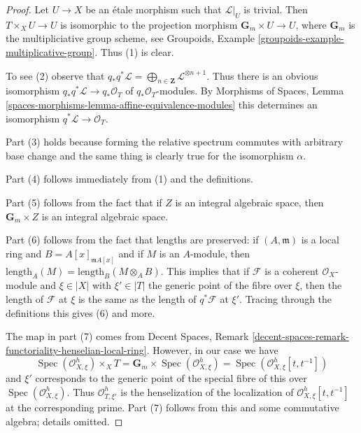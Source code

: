 \documentclass{stacks-project}
\theoremstyle{plain}
\theoremstyle{definition}
\theoremstyle{remark}
\numberwithin{equation}{subsection}
\def\Spec{\mathop{\mathrm{Spec}}}
\begin{document}
\begin{proof}
Let $U \to X$ be an \'etale morphism such that $\mathcal{L}|_U$
is trivial. Then $T \times_X U \to U$ is isomorphic to the projection
morphism $\mathbf{G}_m \times U \to U$, where
$\mathbf{G}_m$ is the multipliciative group scheme, see
Groupoids, Example \ref{groupoids-example-multiplicative-group}.
Thus (1) is clear.

\medskip\noindent
To see (2) observe that
$q_*q^*\mathcal{L} =
\bigoplus_{n \in \mathbf{Z}} \mathcal{L}^{\otimes n + 1}$.
Thus there is an obvious isomorphism
$q_*q^*\mathcal{L} \to q_*\mathcal{O}_T$
of $q_*\mathcal{O}_T$-modules. By Morphisms of Spaces, Lemma
\ref{spaces-morphisms-lemma-affine-equivalence-modules}
this determines an isomorphism $q^*\mathcal{L} \to \mathcal{O}_T$.

\medskip\noindent
Part (3) holds because forming the relative spectrum commutes
with arbitrary base change and the same thing is clearly true
for the isomorphism $\alpha$.

\medskip\noindent
Part (4) follows immediately from (1) and the definitions.

\medskip\noindent
Part (5) follows from the fact that if $Z$ is an integral algebraic
space, then $\mathbf{G}_m \times Z$ is an integral algebraic space.

\medskip\noindent
Part (6) follows from the fact that lengths are preserved:
if $(A, \mathfrak m)$ is a local ring and $B = A[x]_{\mathfrak m A[x]}$
and if $M$ is an $A$-module, then
$\text{length}_A(M) = \text{length}_B(M \otimes_A B)$.
This implies that if $\mathcal{F}$ is a coherent
$\mathcal{O}_X$-module and $\xi \in |X|$ with $\xi' \in |T|$
the generic point of the fibre over $\xi$, then
the length of $\mathcal{F}$ at $\xi$ is the same as the
length of $q^*\mathcal{F}$ at $\xi'$.
Tracing through the definitions this gives (6) and more.

\medskip\noindent
The map in part (7) comes from Decent Spaces, Remark
\ref{decent-spaces-remark-functoriality-henselian-local-ring}.
However, in our case we have
$$
\Spec(\mathcal{O}_{X, \xi}^h) \times_X T =
\mathbf{G}_m \times \Spec(\mathcal{O}_{X, \xi}^h) =
\Spec(\mathcal{O}_{X, \xi}^h[t, t^{-1}])
$$
and $\xi'$ corresponds to the generic point of the special
fibre of this over $\Spec(\mathcal{O}_{X, \xi}^h)$. Thus
$\mathcal{O}_{T, \xi'}^h$ is the henselization of the localization
of $\mathcal{O}_{X, \xi}^h[t, t^{-1}]$ at the corresponding prime.
Part (7) follows from this and some commutative algebra; details omitted.
\end{proof}
\end{document}
